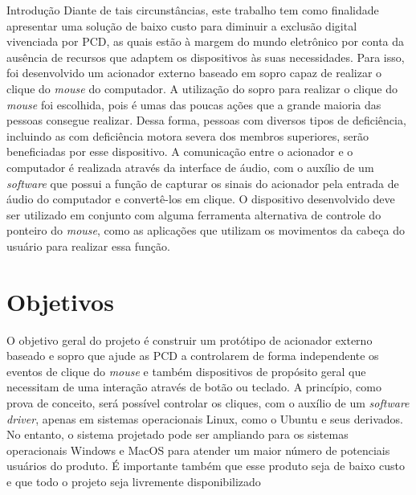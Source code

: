 \begin{chapter}{Introdução}
Diante de tais circunstâncias, este trabalho tem como finalidade apresentar  uma
solução de baixo custo para diminuir a exclusão digital vivenciada por PCD, 
as quais estão à margem do mundo eletrônico por conta da ausência de recursos 
que adaptem os dispositivos às suas necessidades. Para isso, foi desenvolvido 
um acionador externo baseado em sopro capaz de realizar o clique do 
\textit{mouse} do computador. A utilização do sopro para realizar o clique do
\textit{mouse} foi escolhida, pois é umas das poucas ações que a grande maioria
das pessoas consegue realizar.  Dessa forma, pessoas com diversos tipos de
deficiência, incluindo as com deficiência motora severa dos  membros superiores,
serão beneficiadas por esse dispositivo. A comunicação entre o acionador e o
computador é realizada através da interface de áudio, com o auxílio de um
\textit{software} que possui a função de capturar os sinais do acionador pela
entrada de áudio do computador e convertê-los em clique. O dispositivo
desenvolvido deve ser utilizado em conjunto com alguma ferramenta alternativa de
controle do ponteiro do \textit{mouse}, como as aplicações que utilizam os
movimentos da cabeça do usuário para realizar essa função. 


\section{Objetivos}

O objetivo geral do projeto é construir um protótipo de acionador externo
baseado e sopro que ajude as PCD a controlarem de forma independente os eventos
de clique do \textit{mouse} e também dispositivos de propósito geral que
necessitam de uma interação através de botão ou teclado. A princípio, como prova
de conceito, será possível controlar os cliques, com o auxílio de um
\textit{software driver}, apenas em sistemas operacionais Linux, como o Ubuntu e
seus derivados. No entanto, o sistema projetado pode ser ampliando para os
sistemas operacionais Windows e MacOS para atender um maior número de potenciais
usuários do produto. É importante também que esse produto seja de baixo custo e
que todo o projeto seja livremente disponibilizado%



\end{chapter}
